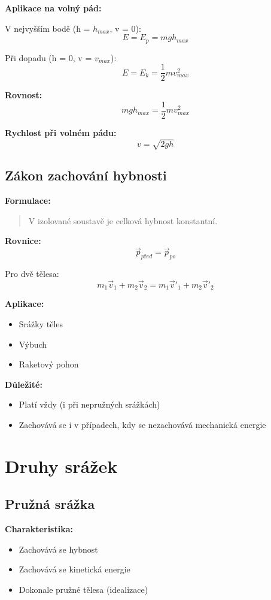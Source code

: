 \documentclass[11pt,a4paper]{article}
\begin{document}
\textbf{Aplikace na volný pád:}

V nejvyšším bodě (h = $h_{max}$, v = 0):
\[E = E_p = mgh_{max}\]

Při dopadu (h = 0, v = $v_{max}$):
\[E = E_k = \frac{1}{2}mv_{max}^2\]

\textbf{Rovnost:}
\[mgh_{max} = \frac{1}{2}mv_{max}^2\]

\textbf{Rychlost při volném pádu:}
\[v = \sqrt{2gh}\]

\subsection{Zákon zachování hybnosti}

\textbf{Formulace:}
\begin{quote}
V izolované soustavě je celková hybnost konstantní.
\end{quote}

\textbf{Rovnice:}
\[\vec{p}_{před} = \vec{p}_{po}\]

Pro dvě tělesa:
\[m_1\vec{v}_1 + m_2\vec{v}_2 = m_1\vec{v}'_1 + m_2\vec{v}'_2\]

\textbf{Aplikace:}
\begin{itemize}
\item Srážky těles
\item Výbuch
\item Raketový pohon
\end{itemize}

\textbf{Důležité:}
\begin{itemize}
\item Platí vždy (i při nepružných srážkách)
\item Zachovává se i v případech, kdy se nezachovává mechanická energie
\end{itemize}

\clearpage

\section{Druhy srážek}

\subsection{Pružná srážka}

\textbf{Charakteristika:}
\begin{itemize}
\item Zachovává se hybnost
\item Zachovává se kinetická energie
\item Dokonale pružné tělesa (idealizace)
\end{itemize}
\end{document}
